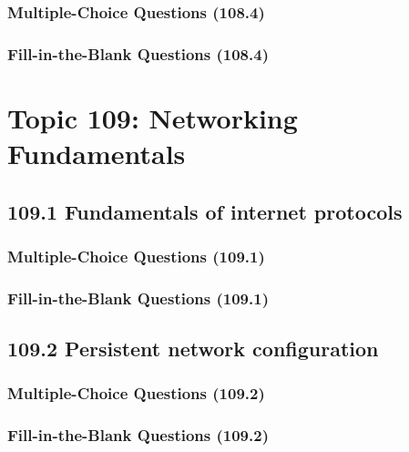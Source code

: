 \documentclass[a4paper]{report}
\begin{document}
\subsubsection*{Multiple-Choice Questions (108.4)}

\subsubsection*{Fill-in-the-Blank Questions (108.4)}


\section*{Topic 109: Networking Fundamentals}

\subsection*{109.1 Fundamentals of internet protocols}
\subsubsection*{Multiple-Choice Questions (109.1)}

\subsubsection*{Fill-in-the-Blank Questions (109.1)}

\subsection*{109.2 Persistent network configuration}
\subsubsection*{Multiple-Choice Questions (109.2)}

\subsubsection*{Fill-in-the-Blank Questions (109.2)}
\end{document}
